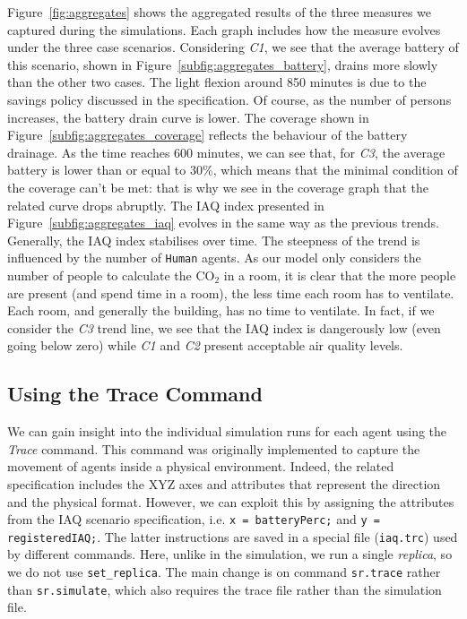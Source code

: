 \documentclass[runningheads]{llncs}
\begin{document}
Figure~\ref{fig:aggregates} shows the aggregated results of the three measures we captured during the simulations.
%
Each graph includes how the measure evolves under the three case scenarios.
%
Considering \emph{C1}, we see that the average battery of this scenario, shown in Figure~\ref{subfig:aggregates_battery}, drains more slowly than the other two cases. The light flexion around 850 minutes is due to the savings policy discussed in the specification.
%
Of course, as the number of persons increases, the battery drain curve is lower.
%
The coverage shown in Figure~\ref{subfig:aggregates_coverage} reflects the behaviour of the battery drainage.
%
As the time reaches 600 minutes, we can see that, for \emph{C3}, the average battery is lower than or equal to 30\%, which means that the minimal condition of the coverage can't be met: that is why we see in the coverage graph that the related curve drops abruptly.
%
The IAQ index presented in Figure~\ref{subfig:aggregates_iaq} evolves in the same way as the previous trends.
%
Generally, the IAQ index stabilises over time.
%
The steepness of the trend is influenced by the number of \lstinline{Human} agents. 
%
As our model only considers the number of people to calculate the CO$_2$ in a room, it is clear that the more people are present (and spend time in a room), the less time each room has to ventilate.
Each room, and generally the building, has no time to ventilate. 
%
In fact, if we consider the \emph{C3} trend line, we see that the IAQ index is dangerously low (even going below zero) while \emph{C1} and \emph{C2} present acceptable air quality levels.


\subsection{Using the Trace Command}\label{subsec:usingtrace}

We can gain insight into the individual simulation runs for each agent using the \emph{Trace} command.
%
This command was originally implemented to capture the movement of agents inside a physical environment. Indeed, the related specification includes the XYZ axes and attributes that represent the direction and the physical format.
%
However, we can exploit this by assigning the attributes from the IAQ scenario specification, i.e. \lstinline{x = batteryPerc;} and \lstinline{y = registeredIAQ;}.
The latter instructions are saved in a special file (\lstinline{iaq.trc}) used by different commands. Here, unlike in the simulation, we run a single \emph{replica}, so we do not use \lstinline{set_replica}. The main change is on command \lstinline{sr.trace} rather than \lstinline{sr.simulate}, which also requires the trace file rather than the simulation file.
\end{document}
